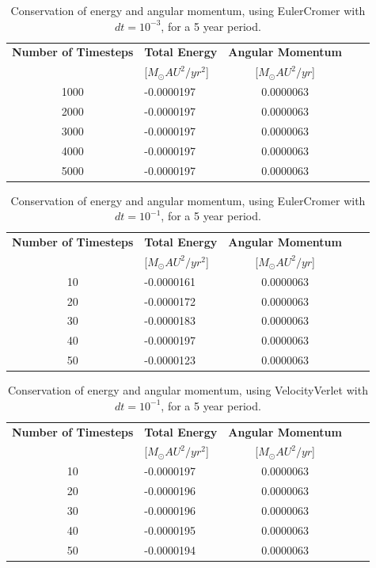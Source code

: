 \documentclass[norsk,a4paper,12pt]{article}
\begin{document}
{\begin{table} [H]
\centering
\caption{Conservation of energy and angular momentum, using EulerCromer with $dt=10^{-3}$, for a 5 year period.}
\begin{tabularx}{\textwidth}{cXcXc} \toprule
    {\bf Number of Timesteps} & {\bf Total Energy }& {\bf Angular Momentum} \\
    &[$M_\odot AU^2/yr^2$]&[$M_\odot AU^2/yr$]\\ \hline
    1000 & -0.0000197 & 0.0000063\\ \hline
    2000 & -0.0000197 & 0.0000063\\ \hline
    3000 & -0.0000197 & 0.0000063\\ \hline
    4000 & -0.0000197 & 0.0000063\\ \hline
    5000 & -0.0000197 & 0.0000063\\ \bottomrule 
\end{tabularx}
\label{euler_dt=10(-3)}
\end{table}

\begin{table} [H]
\centering
\caption{Conservation of energy and angular momentum, using EulerCromer with $dt=10^{-1}$, for a 5 year period.}
\begin{tabularx}{\textwidth}{cXcXc} \toprule
    {\bf Number of Timesteps} & {\bf Total Energy }& {\bf Angular Momentum} \\
    &[$M_\odot AU^2/yr^2$]&[$M_\odot AU^2/yr$]\\ \hline
    10 & -0.0000161 & 0.0000063\\ \hline
    20 & -0.0000172 & 0.0000063\\ \hline
    30 & -0.0000183 & 0.0000063\\ \hline
    40 & -0.0000197 & 0.0000063\\ \hline
    50 & -0.0000123 & 0.0000063\\ \bottomrule 
\end{tabularx}
\label{euler_dt=10(-1)}
\end{table}

\begin{table} [H]
\centering
\caption{Conservation of energy and angular momentum, using VelocityVerlet with $dt=10^{-1}$, for a 5 year period.}
\begin{tabularx}{\textwidth}{cXcXc} \toprule
    {\bf Number of Timesteps} & {\bf Total Energy }& {\bf Angular Momentum} \\
    &[$M_\odot AU^2/yr^2$]&[$M_\odot AU^2/yr$]\\ \hline
    10 & -0.0000197 & 0.0000063\\ \hline
    20 & -0.0000196 & 0.0000063\\ \hline
    30 & -0.0000196 & 0.0000063\\ \hline
    40 & -0.0000195 & 0.0000063\\ \hline
    50 & -0.0000194 & 0.0000063\\ \bottomrule 
\end{tabularx}
\label{verlet_dt=10(-1)}
\end{table}

}
\end{document}
